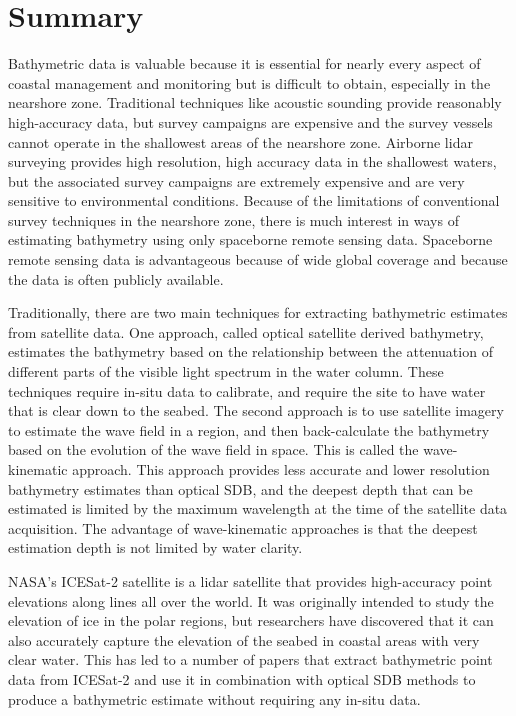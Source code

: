 \chapter*{Summary}

Bathymetric data is valuable because it is essential for nearly every aspect of coastal management and monitoring but is difficult to obtain, especially in the nearshore zone. Traditional techniques like acoustic sounding provide reasonably high-accuracy data, but survey campaigns are expensive and the survey vessels cannot operate in the shallowest areas of the nearshore zone. Airborne lidar surveying provides high resolution, high accuracy data in the shallowest waters, but the associated survey campaigns are extremely expensive and are very sensitive to environmental conditions. Because of the limitations of conventional survey techniques in the nearshore zone, there is much interest in ways of estimating bathymetry using only spaceborne remote sensing data. Spaceborne remote sensing data is advantageous because of wide global coverage and because the data is often publicly available.

Traditionally, there are two main techniques for extracting bathymetric estimates from satellite data. One approach, called optical satellite derived bathymetry, estimates the bathymetry based on the relationship between the attenuation of different parts of the visible light spectrum in the water column. These techniques require in-situ data to calibrate, and require the site to have water that is clear down to the seabed. The second approach is to use satellite imagery to estimate the wave field in a region, and then back-calculate the bathymetry based on the evolution of the wave field in space. This is called the wave-kinematic approach. This approach provides less accurate and lower resolution bathymetry estimates than optical SDB, and the deepest depth that can be estimated is limited by the maximum wavelength at the time of the satellite data acquisition. The advantage of wave-kinematic approaches is that the deepest estimation depth is not limited by water clarity.

NASA's ICESat-2 satellite is a lidar satellite that provides high-accuracy point elevations along lines all over the world. It was originally intended to study the elevation of ice in the polar regions, but researchers have discovered that it can also accurately capture the elevation of the seabed in coastal areas with very clear water. This has led to a number of papers that extract bathymetric point data from ICESat-2 and use it in combination with optical SDB methods to produce a bathymetric estimate without requiring any in-situ data.  

